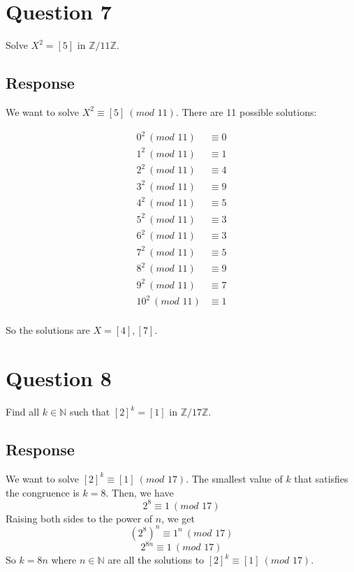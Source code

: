 \documentclass[13pt]{article}
\begin{document}
\newpage
\section*{Question 7}
Solve $X^2 = [5]$ in $\mathbb{Z}/11\mathbb{Z}$.

\subsection*{Response}
We want to solve $X^2 \equiv [5] \ (\textit{mod } 11)$. There are 11 possible solutions:

\begin{align*}
  0^2 \ (\textit{mod } 11) &\equiv 0 \\
  1^2 \ (\textit{mod } 11) &\equiv 1 \\
  2^2 \ (\textit{mod } 11) &\equiv 4 \\
  3^2 \ (\textit{mod } 11) &\equiv 9 \\
  4^2 \ (\textit{mod } 11) &\equiv 5 \\
  5^2 \ (\textit{mod } 11) &\equiv 3 \\
  6^2 \ (\textit{mod } 11) &\equiv 3 \\
  7^2 \ (\textit{mod } 11) &\equiv 5 \\
  8^2 \ (\textit{mod } 11) &\equiv 9 \\
  9^2 \ (\textit{mod } 11) &\equiv 7 \\
  10^2 \ (\textit{mod } 11) &\equiv 1 \\
\end{align*}

So the solutions are $X = [4], [7]$.





\newpage
\section*{Question 8}
Find all $k \in \mathbb{N}$ such that $[2]^k = [1]$ in $\mathbb{Z}/17\mathbb{Z}$.

\subsection*{Response}
We want to solve $[2]^k \equiv [1] \ (\textit{mod } 17)$. The smallest value of $k$ that satisfies
the congruence is $k = 8$. Then, we have
\[2^8 \equiv 1 \ (\textit{mod } 17)\]
Raising both sides to the power of $n$, we get
\[(2^8)^n \equiv 1^n \ (\textit{mod } 17)\]
\[2^{8n} \equiv 1 \ (\textit{mod } 17)\]
So $k = 8n$ where $n \in \mathbb{N}$ are all the solutions to $[2]^k \equiv [1] \ (\textit{mod } 17)$.
\end{document}
